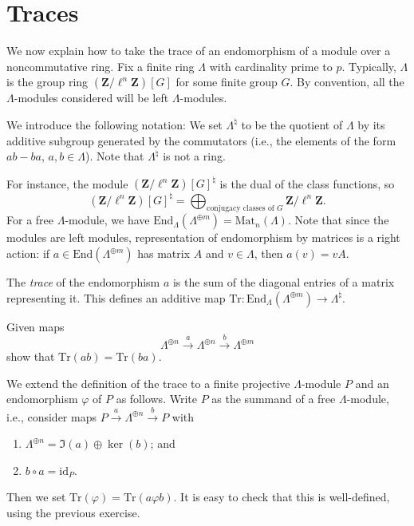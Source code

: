 \section{Traces}
\label{section-traces}

\noindent
We now explain how to take the trace of an endomorphism of a module over a
noncommutative ring. Fix a finite ring $\Lambda$ with cardinality prime to $p$.
Typically, $\Lambda$ is the group ring $(\mathbf{Z}/\ell^n\mathbf{Z})[G]$ for
some finite group $G$. By convention, all the $\Lambda$-modules considered will
be left $\Lambda$-modules.

\medskip\noindent
We introduce the following notation:
We set $\Lambda^\natural$ to be the quotient of $\Lambda$ by its additive
subgroup generated by the commutators (i.e., the elements of the form
$ab-ba$, $a, b \in \Lambda$). Note that $\Lambda^\natural$ is not a ring.

\medskip\noindent
For instance, the module $(\mathbf{Z}/\ell^n\mathbf{Z})[G]^\natural$ is the
dual of the class functions, so
$$
(\mathbf{Z}/\ell^n\mathbf{Z})[G]^\natural
=
\bigoplus\nolimits_{\text{conjugacy classes of }G}
\mathbf{Z}/\ell^n\mathbf{Z}.
$$
For a free $\Lambda$-module, we have $\text{End}_\Lambda(\Lambda^{\oplus m}) =
\text{Mat}_n(\Lambda)$. Note that since the modules are left modules,
representation of endomorphism by matrices is a right action: if $a \in
\text{End}(\Lambda^{\oplus m})$ has matrix $A$ and $v \in \Lambda$, then $a(v)
= v A$.

\begin{definition}
\label{definition-trace}
The {\it trace} of the endomorphism $a$ is the sum of the diagonal entries of
a matrix representing it. This defines an additive map $\text{Tr} :
\text{End}_\Lambda(\Lambda^{\oplus m}) \to \Lambda^\natural$.
\end{definition}

\begin{exercise}
\label{exercise-trace-is-trace}
Given maps
$$
\Lambda^{\oplus n} \xrightarrow{a}
\Lambda^{\oplus n} \xrightarrow{b}
\Lambda^{\oplus m}
$$
show that $\text{Tr}(ab) = \text{Tr}(ba)$.
\end{exercise}

\noindent
We extend the definition of the trace to a finite projective $\Lambda$-module
$P$ and an endomorphism $\varphi$ of $P$ as follows. Write $P$ as the summand
of a free $\Lambda$-module, i.e., consider maps $P \xrightarrow{a}
\Lambda^{\oplus n} \xrightarrow{b} P$ with
\begin{enumerate}
\item
$\Lambda^{\oplus n} = \Im(a) \oplus \ker(b)$; and
\item
$b\circ a = \text{id}_P$.
\end{enumerate}
Then we set $\text{Tr}(\varphi) = \text{Tr}(a\varphi b)$. It is easy to check
that this is well-defined, using the previous exercise.








